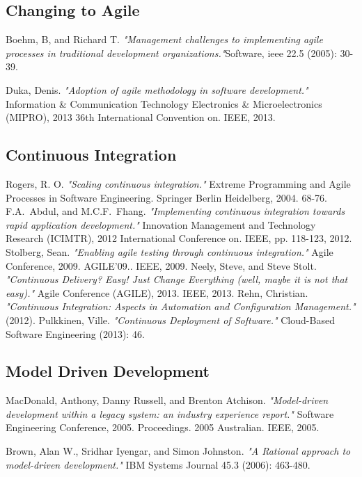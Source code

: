 \documentclass[ProjectPlan_innit.tex]{subfiles}
\begin{document}
\renewcommand\refname{VI. Initial Literature List}
\begin{thebibliography}{1}


\subsection{Changing to Agile}
\bibitem{}
Boehm, B, and Richard T. \emph{"Management challenges to implementing agile processes in traditional development organizations."}Software, ieee 22.5 (2005): 30-39.

\bibitem{}
Duka, Denis. \emph{"Adoption of agile methodology in software development."} Information \& Communication Technology Electronics \& Microelectronics (MIPRO), 2013 36th International Convention on. IEEE, 2013.


\subsection{Continuous Integration}
\bibitem{} 
Rogers, R. O. \emph{"Scaling continuous integration."} Extreme Programming and Agile Processes in Software Engineering. Springer Berlin Heidelberg, 2004. 68-76.
\bibitem{} 
F.A.~Abdul, and M.C.F.~Fhang. \emph{"Implementing continuous integration towards rapid application development."} Innovation Management and Technology Research (ICIMTR), 2012 International Conference on. IEEE, pp. 118-123, 2012.
\bibitem{} 
Stolberg, Sean. \emph{"Enabling agile testing through continuous integration."} Agile Conference, 2009. AGILE'09.. IEEE, 2009.
\bibitem{}
Neely, Steve, and Steve Stolt. \emph{"Continuous Delivery? Easy! Just Change Everything (well, maybe it is not that easy)."} Agile Conference (AGILE), 2013. IEEE, 2013.
\bibitem{} 
Rehn, Christian. \emph{"Continuous Integration: Aspects in Automation and Configuration Management."} (2012).
\bibitem{} 
Pulkkinen, Ville. \emph{"Continuous Deployment of Software."} Cloud-Based Software Engineering (2013): 46.


\subsection{Model Driven Development}
\bibitem{} 
MacDonald, Anthony, Danny Russell, and Brenton Atchison. \emph{"Model-driven development within a legacy system: an industry experience report."} Software Engineering Conference, 2005. Proceedings. 2005 Australian. IEEE, 2005.

\bibitem{}
Brown, Alan W., Sridhar Iyengar, and Simon Johnston. \emph{"A Rational approach to model-driven development."} IBM Systems Journal 45.3 (2006): 463-480.


\end{thebibliography}
\end{document}

